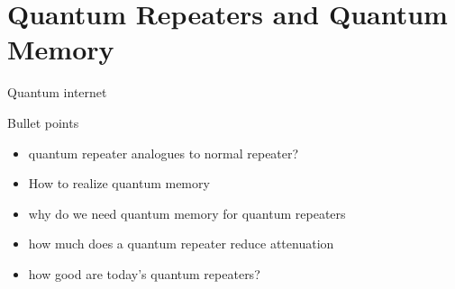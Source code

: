 \section{Quantum Repeaters and Quantum Memory}
Quantum internet \cite{Azuma:2023}
\begin{mybox}{Bullet points}
    \begin{itemize}
        \item quantum repeater analogues to normal repeater?
        \item How to realize quantum memory 
        \item why do we need quantum memory for quantum repeaters
        \item how much does a quantum repeater reduce attenuation
        \item how good are today's quantum repeaters? 
    \end{itemize}
\end{mybox}

